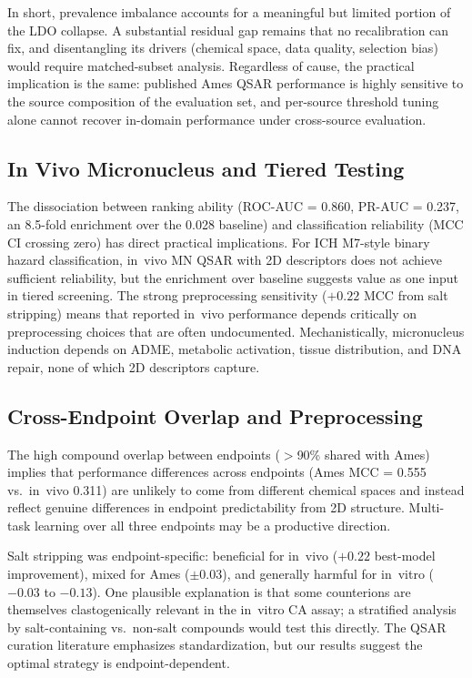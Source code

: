 In short, prevalence imbalance accounts for a meaningful but limited portion of the LDO collapse. A substantial residual gap remains that no recalibration can fix, and disentangling its drivers (chemical space, data quality, selection bias) would require matched-subset analysis. Regardless of cause, the practical implication is the same: published Ames QSAR performance is highly sensitive to the source composition of the evaluation set, and per-source threshold tuning alone cannot recover in-domain performance under cross-source evaluation.

\subsection{In Vivo Micronucleus and Tiered Testing}

The dissociation between ranking ability (ROC-AUC = 0.860, PR-AUC = 0.237, an 8.5-fold enrichment over the 0.028 baseline) and classification reliability (MCC CI crossing zero) has direct practical implications. For ICH M7-style binary hazard classification,\cite{ICH_M7_2017} in~vivo MN QSAR with 2D descriptors does not achieve sufficient reliability, but the enrichment over baseline suggests value as one input in tiered screening.\cite{Dobo_2012} The strong preprocessing sensitivity ($+0.22$ MCC from salt stripping) means that reported in~vivo performance depends critically on preprocessing choices that are often undocumented.\cite{Fourches_2016} Mechanistically, micronucleus induction depends on ADME, metabolic activation, tissue distribution, and DNA repair,\cite{Tweats_2007,Kirkland_2011} none of which 2D descriptors capture.

\subsection{Cross-Endpoint Overlap and Preprocessing}

The high compound overlap between endpoints ($>$90\% shared with Ames) implies that performance differences across endpoints (Ames MCC = 0.555 vs.\ in~vivo 0.311) are unlikely to come from different chemical spaces and instead reflect genuine differences in endpoint predictability from 2D structure.\cite{Tropsha_2010} Multi-task learning over all three endpoints may be a productive direction.\cite{Ramsundar_2015}

Salt stripping was endpoint-specific: beneficial for in~vivo ($+0.22$ best-model improvement), mixed for Ames ($\pm 0.03$), and generally harmful for in~vitro ($-0.03$ to $-0.13$). One plausible explanation is that some counterions are themselves clastogenically relevant in the in~vitro CA assay; a stratified analysis by salt-containing vs.\ non-salt compounds would test this directly. The QSAR curation literature\cite{Fourches_2010,Fourches_2016} emphasizes standardization, but our results suggest the optimal strategy is endpoint-dependent.

